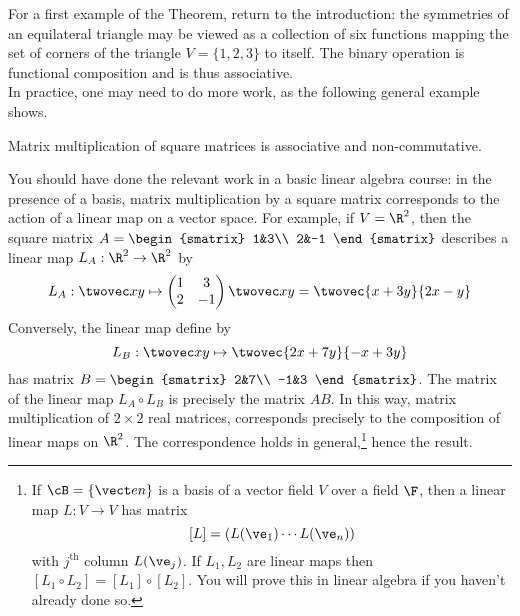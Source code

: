 For a first example of the Theorem, return to the introduction: the symmetries of an equilateral triangle may be viewed as a collection of six functions mapping the set of corners of the triangle $V=\{1,2,3\}$ to itself. The binary operation is functional composition and is thus associative.\\

In practice, one may need to do more work, as the following general example shows.

\begin{cor}\label{cor:assoc}
Matrix multiplication of square matrices is associative and non-commutative.
\end{cor}

You should have done the relevant work in a basic linear algebra course: in the presence of a basis, matrix multiplication by a square matrix corresponds to the action of a linear map on a vector space. For example, if $V=\R^2$, then the square matrix $A=\begin{smatrix}
	1&3\\
	2&-1
	\end{smatrix}$ describes a linear map $L_A:\R^2\to\R^2$ by
	\[L_A:\twovec xy\mapsto\begin{pmatrix}
	1&3\\
	2&-1
	\end{pmatrix}\twovec xy=\twovec{x+3y}{2x-y}\]
	Conversely, the linear map define by
	\[L_B:\twovec xy\mapsto \twovec{2x+7y}{-x+3y}\]
	has matrix $B=\begin{smatrix}
	2&7\\
	-1&3
	\end{smatrix}$. The matrix of the linear map $L_A\circ L_B$ is precisely the matrix $AB$. In this way, matrix multiplication of $2\times 2$ real matrices, corresponds precisely to the composition of linear maps on $\R^2$. The correspondence holds in general,\footnote{If $\cB=\{\vect en\}$ is a basis of a vector field $V$ over a field $\F$, then a linear map $L:V\to V$ has matrix
	\[[L]=(L(\ve_1)\cdots L(\ve_n))\]
	with $j^\text{th}$ column $L(\ve_j)$. If $L_1,L_2$ are linear maps then $[L_1\circ L_2]=[L_1]\circ[L_2]$. You will prove this in linear algebra if you haven't already done so.} hence the result.
% 

